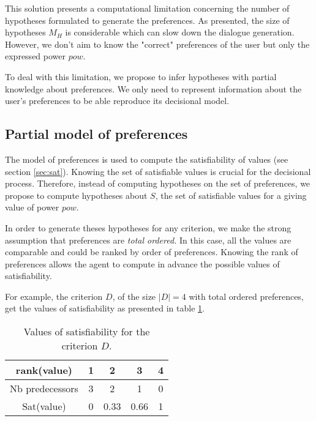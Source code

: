 \documentclass{llncs}
\begin{document}
	This solution presents a computational limitation concerning the number of hypotheses formulated to generate the preferences. As presented, the size of hypotheses $M_H$ is considerable which can slow down the dialogue generation. However, we don't aim to know the "correct" preferences of the user but only the expressed power $pow$. 
	
	To deal with this limitation, we propose to infer hypotheses with partial knowledge about preferences. We only need to represent information about the user's preferences to be able reproduce its decisional model. 
	
	
	
	\subsection{Partial model of preferences}
		
		The model of preferences is used to compute the satisfiability of values (see section \ref{sec:sat}). Knowing the set of satisfiable values is crucial for the decisional process. Therefore, instead of computing hypotheses on the set of preferences, we propose to compute hypotheses about $S$, the set of satisfiable values for a giving value of power $pow$.  
		
		\par In order to generate theses hypotheses for any criterion, we make the strong assumption that preferences are \emph{total ordered.} In this case, all the values are comparable and could be ranked by order of preferences. Knowing the rank of preferences allows the agent to compute in advance the possible values of satisfiability.
	
		For example, the criterion $D$, of the size  $|D| = 4$ with total ordered preferences, get the values of satisfiability as presented in table \ref{tab:poss}.
				 \begin{table}[h]
				 	\centering
				 	\begin{tabular}{ |c|c|c|c|c| }
				 		\hline				
				 		rank(value) & 1 & 2 & 3 & 4 \\
				 		\hline
				 		Nb predecessors & 3 & 2 & 1& 0 \\
				 		\hline
				 		Sat(value) & 0 & 0.33 & 0.66 &1 \\
				 		\hline
				 		
				 	\end{tabular}
				 	\caption{Values of satisfiability for the criterion $D$.}
				 	\label{tab:poss}
				 \end{table}
				 
\end{document}
